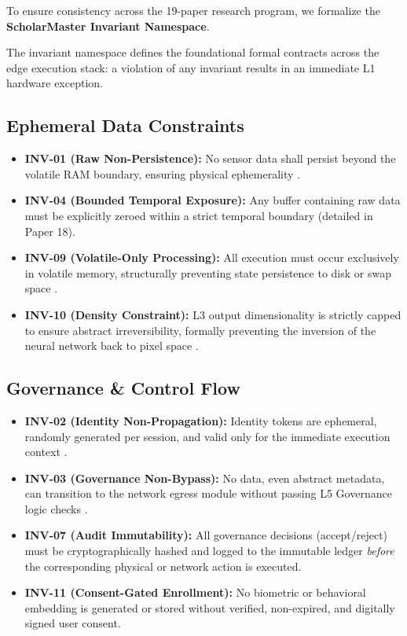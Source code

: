 \documentclass[conference]{IEEEtran}
\begin{document}
To ensure consistency across the 19-paper research program, we formalize the \textbf{ScholarMaster Invariant Namespace}. 

The invariant namespace defines the foundational formal contracts across the edge execution stack: a violation of any invariant results in an immediate L1 hardware exception.

\subsection{Ephemeral Data Constraints}
\begin{itemize}
    \item \textbf{INV-01 (Raw Non-Persistence):} No sensor data shall persist beyond the volatile RAM boundary, ensuring physical ephemerality \cite{b_saltzer}. 
    \item \textbf{INV-04 (Bounded Temporal Exposure):} Any buffer containing raw data must be explicitly zeroed within a strict temporal boundary (detailed in Paper 18). 
    \item \textbf{INV-09 (Volatile-Only Processing):} All execution must occur exclusively in volatile memory, structurally preventing state persistence to disk or swap space \cite{b_satya}.
    \item \textbf{INV-10 (Density Constraint):} L3 output dimensionality is strictly capped to ensure abstract irreversibility, formally preventing the inversion of the neural network back to pixel space \cite{b_saltzer}.
\end{itemize}

\subsection{Governance \& Control Flow}
\begin{itemize}
    \item \textbf{INV-02 (Identity Non-Propagation):} Identity tokens are ephemeral, randomly generated per session, and valid only for the immediate execution context \cite{b_saltzer, b_meyer}.
    \item \textbf{INV-03 (Governance Non-Bypass):} No data, even abstract metadata, can transition to the network egress module without passing L5 Governance logic checks \cite{b_meyer}.
    \item \textbf{INV-07 (Audit Immutability):} All governance decisions (accept/reject) must be cryptographically hashed and logged to the immutable ledger \textit{before} the corresponding physical or network action is executed.
    \item \textbf{INV-11 (Consent-Gated Enrollment):} No biometric or behavioral embedding is generated or stored without verified, non-expired, and digitally signed user consent.
\end{itemize}
\end{document}
